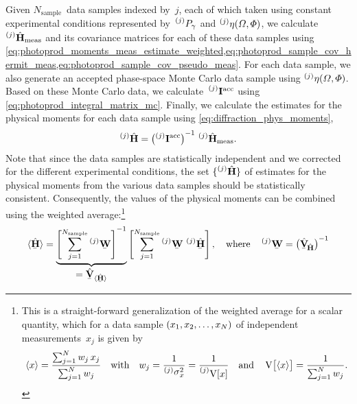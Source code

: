 Given $N_\text{sample}$~data samples indexed by~$j$, each of which
taken using constant experimental conditions represented
by~$\prescript{(j)}{}{P_\gamma}$ and $\prescript{(j)}{}{\eta}(\Omega,
\Phi)$, we calculate
$\prescript{(j)}{}{\vphantom{\vect{H}}}\hat{\vect{H}}_\text{meas}$ and
its covariance matrices for each of these data samples using
\cref{eq:photoprod_moments_meas_estimate_weighted,eq:photoprod_sample_cov_hermit_meas,eq:photoprod_sample_cov_pseudo_meas}.
For each data sample, we also generate an accepted phase-space Monte
Carlo data sample using $\prescript{(j)}{}{\eta}(\Omega, \Phi)$.
Based on these Monte Carlo data, we
calculate~$\prescript{(j)}{}{\ensuremath{\bm{\mathrm{I}}}}^\text{acc}$ using
\cref{eq:photoprod_integral_matrix_mc}.  Finally, we calculate the
estimates for the physical moments for each data sample using
\cref{eq:diffraction_phys_moments}, \ie
\begin{equation}
  \prescript{(j)}{}{\vphantom{\vect{H}}}\hat{\vect{H}}
  = \rBrk[1]{\prescript{(j)}{}{\mat{I}}^\text{acc}}^{-1}\, \prescript{(j)}{}{\vphantom{\vect{H}}}\hat{\vect{H}}_\text{meas}.
\end{equation}
Note that since the data samples are statistically independent and we
corrected for the different experimental conditions, the set
$\cBrk[0]{\prescript{(j)}{}{\vphantom{\vect{H}}}\hat{\vect{H}}}$ of
estimates for the physical moments from the various data samples
should be statistically consistent.  Consequently, the values of the
physical moments can be combined using the weighted
average:\footnote{%
This is a straight-forward generalization of the weighted average for
a scalar quantity, which for a data sample $({x_1, x_2, \ldots,
x_N})$ of independent measurements~$x_j$ is given by
\begin{equation}
  \mean{x}
  = \frac{\sum_{j = 1}^N w_j\, x_j}{\sum_{j = 1}^N w_j}
  \quad\text{with}\quad
  w_j = \frac{1}{\prescript{(j)}{}{\sigma}_x^2} = \frac{1}{\prescript{(j)}{}{\var{x}}}
  \quad\text{and}\quad
  \var{\mean{x}} = \frac{1}{\sum_{j = 1}^N w_j}.
\end{equation}}
\begin{equation}
  \label{eq:photoprod_datasets_weighted_average}
  \mean{\underaccent{\bar}{\hat{\vect{H}}}}
  = \dUnderbrace{\sBrk[4]{\sum_{j = 1}^{N_\text{sample}} \prescript{(j)}{}{\underaccent{\bar}{\mat{W}}}}^{-1}}{= \hat{\underaccent{\bar}{\covMatSym}}_{\mean{\underaccent{\bar}{\hat{\vect{H}}}}}}
  \sBrk[4]{\sum_{j = 1}^{N_\text{sample}} \prescript{(j)}{}{\underaccent{\bar}{\mat{W}}}\,
  \prescript{(j)}{}{\vphantom{\vect{H}}}\underaccent{\bar}{\hat{\vect{H}}}},
  \quad\text{where}\quad
  \prescript{(j)}{}{\underaccent{\bar}{\mat{W}}}
  = \rBrk[1]{\hat{\underaccent{\bar}{\covMatSym}}_{\!\hat{\vect{H}}}}^{-1}
\end{equation}
